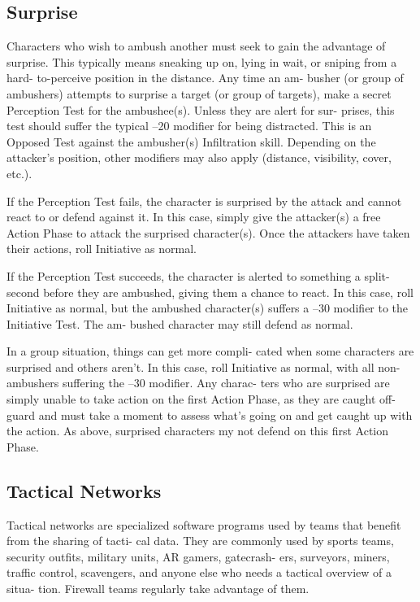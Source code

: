 \subsection{Surprise}

Characters who wish to ambush another must seek to 
gain the advantage of surprise. This typically means 
sneaking up on, lying in wait, or sniping from a hard-
to-perceive position in the distance. Any time an am-
busher (or group of ambushers) attempts to surprise a 
target (or group of targets), make a secret Perception 
Test for the ambushee(s). Unless they are alert for sur-
prises, this test should suffer the typical –20 modifier 
for being distracted. This is an Opposed Test against 
the ambusher(s) Infiltration skill. Depending on the 
attacker's position, other modifiers may also apply 
(distance, visibility, cover, etc.).

If the Perception Test fails, the character is surprised 
by the attack and cannot react to or defend against it. In 
this case, simply give the attacker(s) a free Action Phase 
to attack the surprised character(s). Once the attackers 
have taken their actions, roll Initiative as normal.

If the Perception Test succeeds, the character is 
alerted to something a split-second before they are 
ambushed, giving them a chance to react. In this case, 
roll Initiative as normal, but the ambushed character(s) 
suffers a –30 modifier to the Initiative Test. The am-
bushed character may still defend as normal.

In a group situation, things can get more compli-
cated when some characters are surprised and others 
aren't. In this case, roll Initiative as normal, with all 
non-ambushers suffering the –30 modifier. Any charac-
ters who are surprised are simply unable to take action 
on the first Action Phase, as they are caught off-guard 
and must take a moment to assess what's going on 
and get caught up with the action. As above, surprised 
characters my not defend on this first Action Phase.

\subsection{Tactical Networks}

Tactical networks are specialized software programs  
used by teams that benefit from the sharing of tacti-
cal data. They are commonly used by sports teams, 
security outfits, military units, AR gamers, gatecrash-
ers, surveyors, miners, traffic control, scavengers, and 
anyone else who needs a tactical overview of a situa-
tion. Firewall teams regularly take advantage of them.


